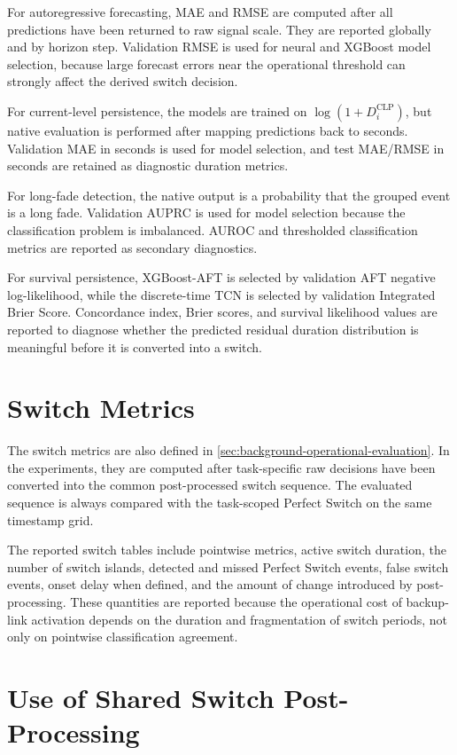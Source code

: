 For autoregressive forecasting, MAE and RMSE are computed after all predictions
have been returned to raw signal scale. They are reported globally and by
horizon step. Validation RMSE is used for neural and XGBoost model selection,
because large forecast errors near the operational threshold can strongly affect
the derived switch decision.

For current-level persistence, the models are trained on
\(\log(1+D_i^{\text{CLP}})\), but native evaluation is performed after mapping
predictions back to seconds. Validation MAE in seconds is used for model
selection, and test MAE/RMSE in seconds are retained as diagnostic duration
metrics.

For long-fade detection, the native output is a probability that the grouped
event is a long fade. Validation AUPRC is used for model selection because the
classification problem is imbalanced. AUROC and thresholded classification
metrics are reported as secondary diagnostics.

For survival persistence, XGBoost-AFT is selected by validation AFT negative
log-likelihood, while the discrete-time TCN is selected by validation
Integrated Brier Score. Concordance index, Brier scores, and survival
likelihood values are reported to diagnose whether the predicted residual
duration distribution is meaningful before it is converted into a switch.

\section{Switch Metrics}
\label{sec:switch-metrics}

The switch metrics are also defined in
\cref{sec:background-operational-evaluation}. In the experiments, they are
computed after task-specific raw decisions have been converted into the common
post-processed switch sequence. The evaluated sequence is always compared with
the task-scoped Perfect Switch on the same timestamp grid.

The reported switch tables include pointwise metrics, active switch duration,
the number of switch islands, detected and missed Perfect Switch events, false
switch events, onset delay when defined, and the amount of change introduced by
post-processing. These quantities are reported because the operational cost of
backup-link activation depends on the duration and fragmentation of switch
periods, not only on pointwise classification agreement.

\section{Use of Shared Switch Post-Processing}
\label{sec:experimental-switch-post-processing}

